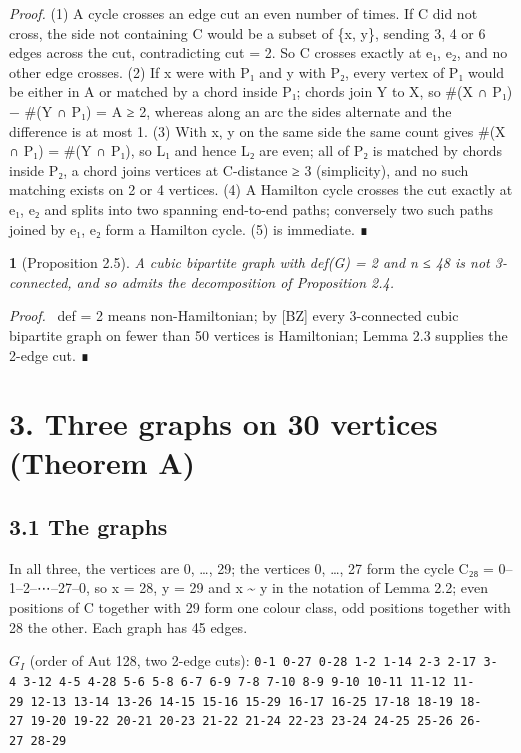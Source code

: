 \documentclass[11pt,a4paper]{article}
\theoremstyle{named}
\newtheorem*{namedthm}{}
\newenvironment{mdproof}[1][Proof]{\par\medskip\noindent\textit{#1.}\ }{\par\medskip}
\begin{document}
\textit{Proof.} (1) A cycle crosses an edge cut an even number of times. If C did not cross, the side not containing C would be a subset of \{x, y\}, sending 3, 4 or 6 edges across the cut, contradicting \textbar{}cut\textbar{} = 2. So C crosses exactly at e₁, e₂, and no other edge crosses. (2) If x were with P₁ and y with P₂, every vertex of P₁ would be either in A or matched by a chord inside P₁; chords join Y to X, so \#(X ∩ P₁) − \#(Y ∩ P₁) = \textbar{}A\textbar{} ≥ 2, whereas along an arc the sides alternate and the difference is at most 1. (3) With x, y on the same side the same count gives \#(X ∩ P₁) = \#(Y ∩ P₁), so L₁ and hence L₂ are even; all of P₂ is matched by chords inside P₂, a chord joins vertices at C-distance ≥ 3 (simplicity), and no such matching exists on 2 or 4 vertices. (4) A Hamilton cycle crosses the cut exactly at e₁, e₂ and splits into two spanning end-to-end paths; conversely two such paths joined by e₁, e₂ form a Hamilton cycle. (5) is immediate. ∎

\begin{namedthm}[Proposition 2.5]
A cubic bipartite graph with def(G) = 2 and n ≤ 48 is not 3-connected, and so admits the decomposition of Proposition 2.4.
\end{namedthm}
\begin{mdproof}[Proof]
def = 2 means non-Hamiltonian; by [BZ] every 3-connected cubic bipartite graph on fewer than 50 vertices is Hamiltonian; Lemma 2.3 supplies the 2-edge cut. ∎
\end{mdproof}

\section*{3. Three graphs on 30 vertices (Theorem A)}

\subsection*{3.1 The graphs}
In all three, the vertices are 0, …, 29; the vertices 0, …, 27 form the cycle C₂₈ = 0–1–2–⋯–27–0, so x = 28, y = 29 and x \textasciitilde{} y in the notation of Lemma 2.2; even positions of C together with 29 form one colour class, odd positions together with 28 the other. Each graph has 45 edges.

\textbf{$G_I$} (order of Aut 128, two 2-edge cuts): \texttt{0-1\ \allowbreak{}0-27\ \allowbreak{}0-28\ \allowbreak{}1-2\ \allowbreak{}1-14\ \allowbreak{}2-3\ \allowbreak{}2-17\ \allowbreak{}3-4\ \allowbreak{}3-12\ \allowbreak{}4-5\ \allowbreak{}4-28\ \allowbreak{}5-6\ \allowbreak{}5-8\ \allowbreak{}6-7\ \allowbreak{}6-9\ \allowbreak{}7-8\ \allowbreak{}7-10\ \allowbreak{}8-9\ \allowbreak{}9-10\ \allowbreak{}10-11\ \allowbreak{}11-12\ \allowbreak{}11-29\ \allowbreak{}12-13\ \allowbreak{}13-14\ \allowbreak{}13-26\ \allowbreak{}14-15\ \allowbreak{}15-16\ \allowbreak{}15-29\ \allowbreak{}16-17\ \allowbreak{}16-25\ \allowbreak{}17-18\ \allowbreak{}18-19\ \allowbreak{}18-27\ \allowbreak{}19-20\ \allowbreak{}19-22\ \allowbreak{}20-21\ \allowbreak{}20-23\ \allowbreak{}21-22\ \allowbreak{}21-24\ \allowbreak{}22-23\ \allowbreak{}23-24\ \allowbreak{}24-25\ \allowbreak{}25-26\ \allowbreak{}26-27\ \allowbreak{}28-29}
\end{document}
